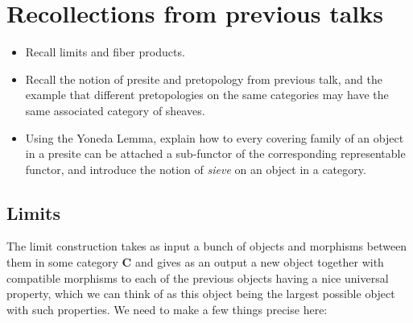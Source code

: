 \documentclass[12pt,a4paper]{amsart}
\theoremstyle{plain}
\theoremstyle{definition}
\theoremstyle{remark}
\begin{document}
\section{Recollections from previous talks}

{\color[rgb]{0.2,0.2,0.6}
\begin{itemize}
  \item Recall limits and fiber products.
  \item Recall the notion of presite and pretopology from previous talk, and the example that different pretopologies on the same categories may have the same associated category of sheaves.
  \item Using the Yoneda Lemma, explain how to every covering family of an object in a presite can be attached a sub-functor of the corresponding representable functor, and introduce the notion of \textit{sieve} on an object in a category.
\end{itemize}
}

\subsection{Limits}

The limit construction takes as input a bunch of objects and morphisms between them in some category $\mathbf{C}$ and gives as an output a new object together with compatible morphisms to each of the previous objects having a nice universal property, which we can think of as this object being the largest possible object with such properties.
We need to make a few things precise here:
\end{document}
